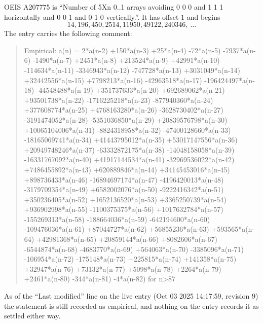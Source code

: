 \documentclass[11pt,a4paper]{article}
\theoremstyle{plain}
\theoremstyle{definition}
\begin{document}
OEIS A207775 is ``Number of 5Xn 0..1 arrays avoiding 0 0 0 and 1 1 1 horizontally and 0 0 1 and 0 1 0 vertically.''. It has offset
$1$ and begins
\[
14, 196, 450, 2514, 11950, 49122, 240346,\ \dots
\]
The entry carries the following comment:
\begin{quote}\small
Empirical: a(n) = 2*a(n-2) +150*a(n-3) +25*a(n-4) -72*a(n-5) -7937*a(n-6) -1490*a(n-7) +2451*a(n-8) +213524*a(n-9) +42991*a(n-10) -114634*a(n-11) -3346943*a(n-12) -747728*a(n-13) +3031049*a(n-14) +32442556*a(n-15) +7798213*a(n-16) -42963518*a(n-17) -196424497*a(n-18) -44548488*a(n-19) +351737633*a(n-20) +692689062*a(n-21) +93501738*a(n-22) -1716225218*a(n-23) -877940360*a(n-24) +377608774*a(n-25) +4768163280*a(n-26) -3628730402*a(n-27) -3191474052*a(n-28) -5351036850*a(n-29) +20839576798*a(n-30) +10065104006*a(n-31) -8824318958*a(n-32) -47400128660*a(n-33) -18165069741*a(n-34) +41443795012*a(n-35) +53017147556*a(n-36) +20949748246*a(n-37) -63332872175*a(n-38) -14048158058*a(n-39) -16331767092*a(n-40) +41917144534*a(n-41) -32969536022*a(n-42) +7486455892*a(n-43) +620889846*a(n-44) +34145453016*a(n-45) +898736433*a(n-46) -16894697174*a(n-47) -4196420013*a(n-48) -3179709354*a(n-49) +6582002076*a(n-50) -9222416342*a(n-51) +350236405*a(n-52) +1652136520*a(n-53) +3365250739*a(n-54) +936902998*a(n-55) -1100375375*a(n-56) +1017632784*a(n-57) -155269313*a(n-58) -188664036*a(n-59) -642194600*a(n-60) -109476036*a(n-61) +87044727*a(n-62) +56855236*a(n-63) +593565*a(n-64) +42981368*a(n-65) +20859144*a(n-66) +8082606*a(n-67) -6544874*a(n-68) -4683770*a(n-69) +564063*a(n-70) -3385096*a(n-71) -106954*a(n-72) -175148*a(n-73) +225815*a(n-74) +141358*a(n-75) +32947*a(n-76) +73132*a(n-77) +5098*a(n-78) +2264*a(n-79) +2461*a(n-80) -344*a(n-81) -4*a(n-82) for n>87
\end{quote}
As of the ``Last modified'' line on the live entry (Oct 03 2025 14:17:59, revision
9) the statement is still recorded as empirical, and nothing on the entry
records it as settled either way.
\end{document}
